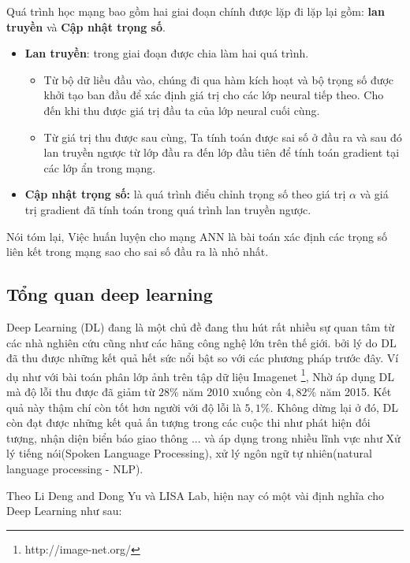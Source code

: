 	Quá trình học mạng bao gồm hai giai đoạn chính được lặp đi lặp lại gồm: \textbf{lan truyền} và \textbf{Cập nhật trọng số}. \par
	\begin{itemize} 
	\item \textbf{Lan truyền}: trong giai đoạn được chia làm hai quá trình.
	\begin{itemize}
		\item Từ bộ dữ liều đầu vào, chúng đi qua hàm kích hoạt và bộ trọng số được khởi tạo ban đầu để xác định giá trị cho các lớp neural tiếp theo. Cho đến khi thu được giá trị đầu ta của lớp neural cuối cùng. 
		\item Từ giá trị thu được sau cùng, Ta tính toán được sai số ở đầu ra và sau đó lan truyền ngược từ lớp đầu ra đến lớp đầu tiên để tính toán gradient tại các lớp ẩn trong mạng.
	\end{itemize}
	\item \textbf{Cập nhật trọng số:} là quá trình điểu chỉnh trọng số theo giá trị $\alpha$ và giá trị gradient đã tính toán trong quá trình lan truyền ngược.
	\end{itemize}
	 Nói tóm lại, Việc huấn luyện cho mạng ANN là bài toán xác định các trọng số liên kết trong mạng sao cho sai số đầu ra là nhỏ nhất.\par
\subsection{Tổng quan deep learning}
	Deep Learning (DL) đang là một chủ đề đang thu hút rất nhiều sự quan tâm từ các nhà nghiên cứu cũng như các hãng công nghệ lớn trên thế giới. bởi lý do DL đã thu được  những kết quả hết sức nổi bật so với các phương pháp trước đây. Ví dụ như với bài toán phân lớp ảnh trên tập dữ liệu Imagenet \footnote{http://image-net.org/}, Nhờ áp dụng DL mà độ lỗi thu được đã giảm từ $ 28\% $ năm 2010 xuống còn $ 4,82\% $ năm 2015. Kết quả này thậm chí còn tốt hơn người với độ lỗi là $ 5,1\% $. Không dừng lại ở đó, DL còn đạt được những kết quả ấn tượng trong các cuộc thi như phát hiện đối tượng, nhận diện biển báo giao thông ... và áp dụng trong nhiều lĩnh vực như Xử lý tiếng nói(Spoken Language Processing), xử lý ngôn ngữ tự nhiên(natural language processing - NLP). \par
	
	Theo Li Deng and Dong Yu  và LISA Lab, hiện nay có một vài định nghĩa cho Deep Learning như sau: \par
	
